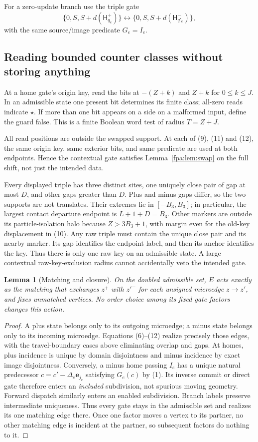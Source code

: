 \documentclass[11pt,a4paper]{article}
\numberwithin{equation}{section}
\newtheorem{lemma}[theorem]{Lemma}
\newcommand{\Hh}{\mathsf H}\newcommand{\Oo}{\mathsf O}\newcommand{\Ii}{\mathsf I}\newcommand{\HH}{\mathsf H}
\begin{document}
For a zero-update branch use the triple gate
\[
 \{0,S,S+d(\Hh_{q_e}^+)\}\longleftrightarrow
 \{0,S,S+d(\Hh_{q'_e}^-)\},                           \tag{12}\label{fpa:eq:zero}
\]
with the same source/image predicate $G_e=I_e$.

\subsection{Reading bounded counter classes without storing anything}
At a home gate's origin key, read the bits at $-(Z+k)$ and $Z+k$ for
$0\le k\le J$. In an admissible state one present bit determines its finite
class; all-zero reads indicate $\star$. If more than one bit appears on a
side on a malformed input, define the guard false. This is a finite Boolean
word test of radius $T=Z+J$.

All read positions are outside the swapped support. At each of (9), (11)
and (12), the same origin key, same exterior bits, and same predicate are used
at both endpoints. Hence the contextual gate satisfies Lemma~\ref{fpa:lem:swap}
on the full shift, not just the intended data.

Every displayed triple has three distinct sites, one uniquely close pair of
gap at most $D$, and other gaps greater than $D$. Plus and minus gaps differ,
so the two supports are not translates. Their extremes lie in $[-B_3,B_3]$;
in particular, the largest contact departure endpoint is $L+1+D=B_3$.
Other markers are outside its particle-isolation halo because
$Z>3B_3+1$, with margin even for the old-key displacement in (10). Any raw
triple must contain the unique close pair and its nearby marker. Its gap
identifies the endpoint label, and then its anchor identifies the key. Thus
there is only one raw key on an admissible state. A large contextual
raw-key-exclusion radius cannot accidentally veto the intended gate.

\begin{lemma}[Matching and closure]\label{fpa:lem:matching}
On the doubled admissible set, $E$ acts exactly as the matching that exchanges
$z^+$ with $z'^-$ for each unsigned microedge $z\to z'$, and fixes unmatched
vertices. No order choice among its fixed gate factors changes this action.
\end{lemma}
\begin{proof}
A plus state belongs only to its outgoing microedge; a minus state belongs only
to its incoming microedge. Equations (6)--(12) realize precisely those edges,
with the travel-boundary cases above eliminating overlap and gaps. At homes,
plus incidence is unique by domain disjointness and minus incidence by exact
image disjointness. Conversely, a minus home passing $I_e$ has a unique natural
predecessor $c=c'-\Delta_e\mathbf e_{j_e}$ satisfying $G_e(c)$ by (1).
Its inverse commit or direct gate therefore enters an \emph{included}
subdivision, not spurious moving geometry. Forward dispatch similarly enters
an enabled subdivision. Branch labels preserve intermediate uniqueness.
Thus every gate stays in the admissible set and realizes its one matching
edge there. Once one factor moves a vertex to its partner, no other matching
edge is incident at the partner, so subsequent factors do nothing to it.
\end{proof}
\end{document}
